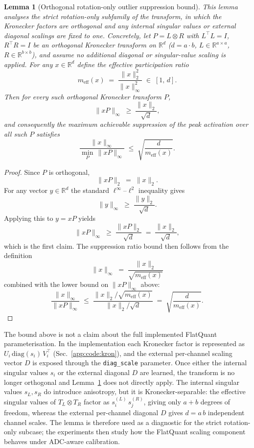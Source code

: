 \documentclass[a4paper,11pt,oneside]{article}
\theoremstyle{breakstyle}
\newtheorem{lemma}{Lemma}[section]
\begin{document}
  \begin{lemma}[Orthogonal rotation-only outlier suppression bound]
    \label{lem:rotation-bound}
    This lemma analyses the strict rotation-only subfamily of the
    transform, in which the Kronecker factors are orthogonal and any
    internal singular values or external diagonal scalings are fixed
    to one.  Concretely, let $P = L \otimes R$ with
    $L^{\top}L = I$, $R^{\top}R = I$ be an orthogonal Kronecker
    transform on $\mathbb{R}^d$
    ($d = a \cdot b$,
    $L \in \mathbb{R}^{a \times a}$,
    $R \in \mathbb{R}^{b \times b}$),
    and assume no additional diagonal or singular-value scaling is
    applied.  For any $x \in \mathbb{R}^d$ define the effective
    participation ratio
    \[
      m_{\mathrm{eff}}(x) \;=\; \frac{\|x\|_2^2}{\|x\|_\infty^2}
      \;\in\; [1,\, d].
    \]
    Then for every such orthogonal Kronecker transform $P$,
    \[
      \|xP\|_\infty \;\ge\; \frac{\|x\|_2}{\sqrt{d}},
    \]
    and consequently the maximum achievable suppression of the peak
    activation over all such $P$ satisfies
    \[
      \frac{\|x\|_\infty}{\min_{P}\,\|xP\|_\infty}
      \;\le\;
      \sqrt{\frac{d}{m_{\mathrm{eff}}(x)}}.
    \]
  \end{lemma}

  \begin{proof}
    Since $P$ is orthogonal,
    \[
      \|xP\|_2 \;=\; \|x\|_2.
    \]
    For any vector $y \in \mathbb{R}^d$ the standard
    $\ell^\infty$--$\ell^2$ inequality gives
    \[
      \|y\|_\infty \;\ge\; \frac{\|y\|_2}{\sqrt{d}}.
    \]
    Applying this to $y = xP$ yields
    \[
      \|xP\|_\infty
      \;\ge\;
      \frac{\|xP\|_2}{\sqrt{d}}
      \;=\;
      \frac{\|x\|_2}{\sqrt{d}},
    \]
    which is the first claim. The suppression ratio bound then
    follows from the definition
    \[
      \|x\|_\infty \;=\; \frac{\|x\|_2}{\sqrt{m_{\mathrm{eff}}(x)}}
    \]
    combined with the lower bound on $\|xP\|_\infty$ above:
    \[
      \frac{\|x\|_\infty}{\|xP\|_\infty}
      \;\le\;
      \frac{\|x\|_2 / \sqrt{m_{\mathrm{eff}}(x)}}{\|x\|_2 / \sqrt{d}}
      \;=\;
      \sqrt{\frac{d}{m_{\mathrm{eff}}(x)}}.
    \]
  \end{proof}

  The bound above is not a claim about the full implemented FlatQuant
  parameterisation.  In the implementation each Kronecker factor is
  represented as $U_i \,\mathrm{diag}(s_i)\, V_i^{\top}$
  (Sec.~\ref{app:code:kron}), and the external per-channel scaling
  vector $D$ is exposed through the \texttt{diag\_scale} parameter.
  Once either the internal singular values $s_i$ or the external
  diagonal $D$ are learned, the transform is no longer orthogonal
  and Lemma~\ref{lem:rotation-bound} does not directly apply.  The
  internal singular values $s_L, s_R$ do introduce anisotropy, but it
  is Kronecker-separable: the effective singular values of
  $T_L \otimes T_R$ factor as $s^{(L)}_i\,s^{(R)}_j$, giving only
  $a + b$ degrees of freedom, whereas the external per-channel
  diagonal $D$ gives $d = a\,b$ independent channel scales.  The
  lemma is therefore used as a diagnostic for the strict
  rotation-only subcase; the experiments then study how the
  FlatQuant scaling component behaves under ADC-aware calibration.
\end{document}
